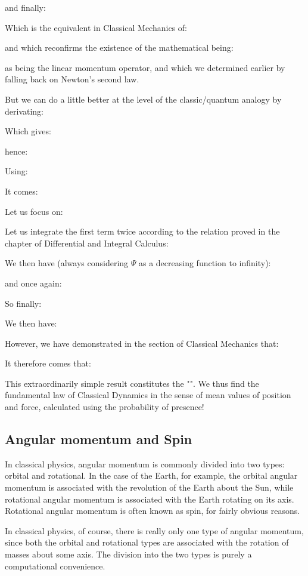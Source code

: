 	and finally:
	
	Which is the equivalent in Classical Mechanics of:
	
	and which reconfirms the existence of the mathematical being:
	
	as being the linear momentum operator, and which we determined earlier by falling back on Newton's second law.

	But we can do a little better at the level of the classic/quantum analogy by derivating:
	
	Which gives:
	
	hence:
	
	Using:
	
	It comes:
	
	Let us focus on:
	
	Let us integrate the first term twice according to the relation proved in the chapter of Differential and Integral Calculus:
	
	We then have (always considering $\Psi$ as a decreasing function to infinity):
	
	and once again:
	
	So finally:
	
	We then have:
	
	However, we have demonstrated in the section of Classical Mechanics that:
	
	It therefore comes that:
	
	This extraordinarily simple result constitutes the "". We thus find the fundamental law of Classical Dynamics in the sense of mean values of position and force, calculated using the probability of presence!
	
	\pagebreak
	\subsection{Angular momentum and Spin}\label{angular momentum and spin}
	In classical physics, angular momentum is commonly divided into two types: orbital and rotational. In the case of the Earth, for example, the orbital angular momentum is associated with the revolution of the Earth about the Sun, while rotational angular momentum is associated with the Earth rotating on its axis. Rotational angular momentum is often known as spin, for fairly obvious reasons.

	In classical physics, of course, there is really only one type of angular momentum, since both the orbital and rotational types are associated with the rotation of masses about some axis. The division into the two types is purely a computational convenience.
	
